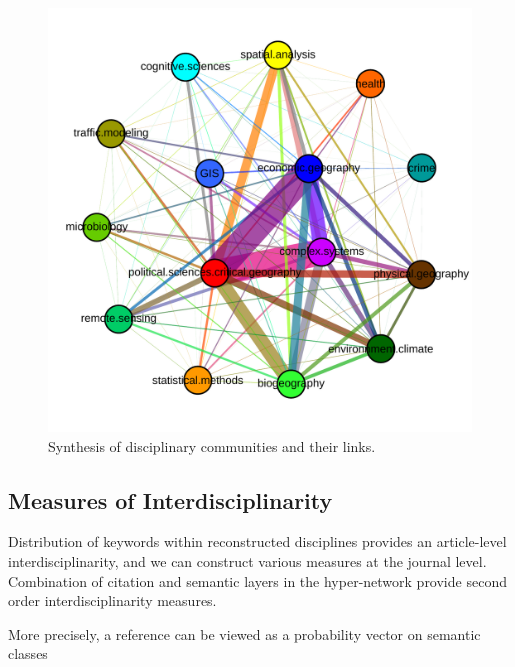 \begin{figure}
\centering
\includegraphics[width=\textwidth]{figures/synththemcyb}
\caption{Synthesis of disciplinary communities and their links.}
\label{fig:comsynthesis}
\end{figure}




\subsection*{Measures of Interdisciplinarity}





Distribution of keywords within reconstructed disciplines provides an article-level interdisciplinarity, and we can construct various measures at the journal level. Combination of citation and semantic layers in the hyper-network provide second order interdisciplinarity measures.

More precisely, a reference can be viewed as a probability vector on semantic classes



